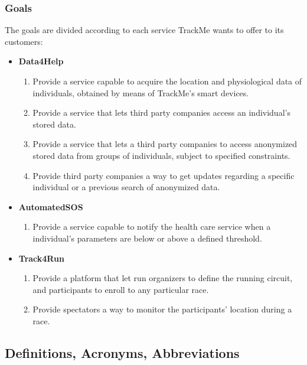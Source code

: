 \documentclass[12pt]{article}
\newcommand\goal[1]{\item[{[G#1]}] }
\begin{document}
\subsubsection{Goals}
The goals are divided according to each service TrackMe wants to offer to its customers:
\begin{itemize}
\item{\textbf{Data4Help}}
\begin{enumerate}
\goal{1} Provide a service capable to acquire the location and physiological data of individuals, obtained by means of TrackMe's smart devices.
\goal{2} Provide a service that lets third party companies access an individual's stored data.
\goal{3} Provide a service that lets a third party companies to access anonymized stored data from groups of individuals, subject to specified constraints.
\goal{4} Provide third party companies a way to get updates regarding a specific individual or a previous search of anonymized data.
\end{enumerate}

\item{\textbf{AutomatedSOS}}
\begin{enumerate}
\goal{5} Provide a service capable to notify the health care service when a individual's parameters are below or above a defined threshold.
\end{enumerate}

\item{\textbf{Track4Run}}
\begin{enumerate}
\goal{6} Provide a platform that let run organizers to define the running circuit, and participants to enroll to any particular race.
\goal{7} Provide spectators a way to monitor the participants' location during a race.
\end{enumerate}
\end{itemize}

\subsection{Definitions, Acronyms, Abbreviations}
\end{document}
